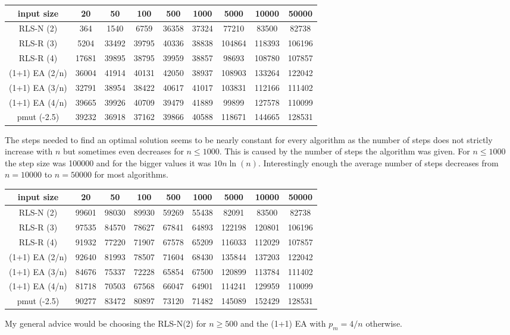 \begin{tabular}[h]{ccccccccc}
      input size     & 20    & 50    & 100   & 500   & 1000  & 5000   & 10000  & 50000  \\\hline
      RLS-N (2)      & 364   & 1540  & 6759  & 36358 & 37324 & 77210  & 83500  & 82738  \\
      RLS-R (3)      & 5204  & 33492 & 39795 & 40336 & 38838 & 104864 & 118393 & 106196 \\
      RLS-R (4)      & 17681 & 39895 & 38795 & 39959 & 38857 & 98693  & 108780 & 107857 \\
      (1+1) EA (2/n) & 36004 & 41914 & 40131 & 42050 & 38937 & 108903 & 133264 & 122042 \\
      (1+1) EA (3/n) & 32791 & 38954 & 38422 & 40617 & 41017 & 103831 & 112166 & 111402 \\
      (1+1) EA (4/n) & 39665 & 39926 & 40709 & 39479 & 41889 & 99899  & 127578 & 110099 \\
      pmut (-2.5)    & 39232 & 36918 & 37162 & 39866 & 40588 & 118671 & 144665 & 128531 \\
\end{tabular}

The steps needed to find an optimal solution seems to be nearly constant for every algorithm as the number of steps does not strictly increase with $n$ but sometimes even decreases for $n\le1000$.
This is caused by the number of steps the algorithm was given.
For $n\le1000$ the step size was 100000 and for the bigger values it was $10n\ln(n)$.
Interestingly enough the average number of steps decreases from $n=10000$ to $n=50000$ for most algorithms.

\begin{tabular}[h]{ccccccccc}
      input size     & 20    & 50    & 100   & 500   & 1000  & 5000   & 10000  & 50000  \\\hline
      RLS-N (2)      & 99601 & 98030 & 89930 & 59269 & 55438 & 82091  & 83500  & 82738  \\
      RLS-R (3)      & 97535 & 84570 & 78627 & 67841 & 64893 & 122198 & 120801 & 106196 \\
      RLS-R (4)      & 91932 & 77220 & 71907 & 67578 & 65209 & 116033 & 112029 & 107857 \\
      (1+1) EA (2/n) & 92640 & 81993 & 78507 & 71604 & 68430 & 135844 & 137203 & 122042 \\
      (1+1) EA (3/n) & 84676 & 75337 & 72228 & 65854 & 67500 & 120899 & 113784 & 111402 \\
      (1+1) EA (4/n) & 81718 & 70503 & 67568 & 66047 & 64901 & 114241 & 129959 & 110099 \\
      pmut (-2.5)    & 90277 & 83472 & 80897 & 73120 & 71482 & 145089 & 152429 & 128531 \\
\end{tabular}

My general advice would be choosing the RLS-N(2) for $n\ge500$ and the (1+1) EA with $p_m=4/n$ otherwise.